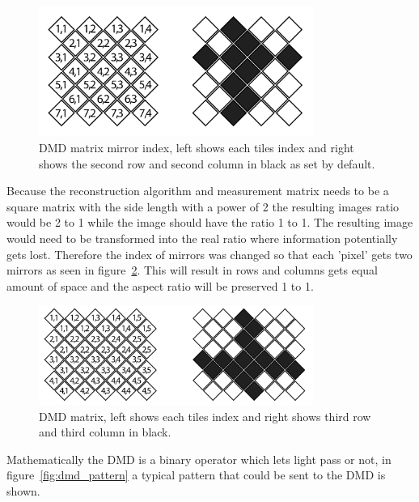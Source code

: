\begin{figure}[H]
    \centering
    \includegraphics[width = 0.8\textwidth]{gfx/DMD_grid.png}
    \caption{DMD matrix mirror index, left shows each tiles index and right shows the second row and second column in black as set by default.}
    \label{fig:dmd_index}
\end{figure}

Because the reconstruction algorithm and measurement matrix needs to be a square matrix with the side length with a power of 2 the resulting images ratio would be 2 to 1 while the image should have the ratio 1 to 1. The resulting image would need to be transformed into the real ratio where information potentially gets lost. Therefore the index of mirrors was changed so that each 'pixel' gets two mirrors as seen in figure~\ref{fig:dmd_index2}. This will result in rows and columns gets equal amount of space and the aspect ratio will be preserved 1 to 1. 

\begin{figure}[H]
    \centering
    \includegraphics[width = 0.8\textwidth]{gfx/DMD_grid2.png}
    \caption{DMD matrix, left shows each tiles index and right shows third row and third column in black.}
    \label{fig:dmd_index2}
\end{figure}

Mathematically the DMD is a binary operator which lets light pass or not, in figure~\ref{fig:dmd_pattern} a typical pattern that could be sent to the DMD is shown.  

